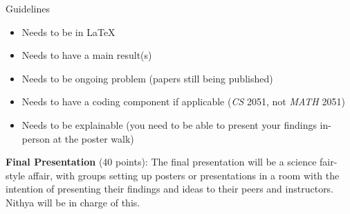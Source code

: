 \documentclass{article}
\begin{document}
\begin{itemize}
    
Guidelines
\begin{itemize}
    \item Needs to be in \LaTeX
    \item Needs to have a main result(s)
    \item Needs to be ongoing problem (papers still being published)
    \item Needs to have a coding component if applicable (\textit{CS} 2051, not \textit{MATH} 2051)
    \item Needs to be explainable (you need to be able to present your findings in-person at the poster walk)
\end{itemize}
    

    \textbf{Final Presentation} (40 points): The final presentation will be a science fair-style affair, with groups setting up posters or presentations in a room with the intention of presenting their findings and ideas to their peers and instructors. Nithya will be in charge of this.
\end{itemize}
\end{document}
